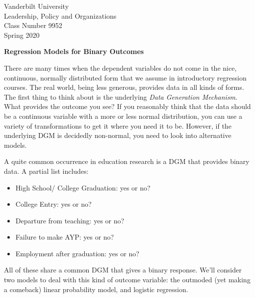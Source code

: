 \documentclass[12pt]{article}
\begin{document}
\thispagestyle{empty}%

\setlength{\parskip}{1ex plus 0.5ex minus 0.2ex}

\setcounter{secnumdepth}{-2}


\begin{flushleft}
Vanderbilt University\\Leadership, Policy and Organizations\\Class Number 9952\\ Spring 2020\\
\end{flushleft}

\begin{center}
\textbf{Regression Models for Binary Outcomes}
\end{center}


There are many times when the dependent variables do not come in the
nice, continuous, normally distributed form that we assume in
introductory regression courses. The real world, being less generous,
provides data in all kinds of forms. The first thing to think about is
the underlying \textit{Data Generation Mechanism}. What provides the
outcome you see? If you reasonably think that the data should be a
continuous variable with a more or less normal distribution, you can
use a variety of transformations to get it where you need it to
be. However, if the underlying DGM is decidedly non-normal, you need
to look into alternative models.

A quite common occurrence in education research is a DGM that provides
binary data. A partial list includes:

\begin{itemize}
\item High School/ College Graduation: yes or no?

\item College Entry: yes or no?

\item Departure from teaching: yes or no?

\item Failure to make AYP: yes or no?

\item Employment after graduation: yes or no?

\end{itemize}

All of these share a common DGM that gives a binary response. We'll
consider two models to deal with this kind of outcome variable: the
outmoded (yet making a comeback) linear probability model, and logistic regression. 
\end{document}
